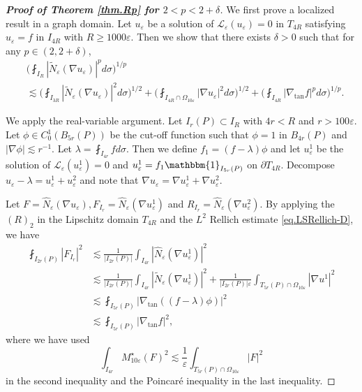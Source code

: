 \documentclass[reqno,12pt]{amsart} %
\theoremstyle{definition}
\theoremstyle{remark}
\numberwithin{equation}{section}
\newcommand{\cL}{\mathcal{L}}
\newcommand{\e}{\varepsilon}
\begin{document}
\begin{proof}[\textbf{Proof of Theorem \ref{thm.Rp} for $2<p<2+\delta$}]
We first prove a localized result in a graph domain. Let $u_\e$ be a solution of $\cL_\e(u_\e) = 0$ in $T_{4R}$ satisfying $u_\e = f$ in $I_{4R}$ with $R \ge 1000\e$. Then we show that there exists $\delta > 0$ such that for any $p\in (2, 2+\delta)$,
\begin{equation}\label{est.RpInTR}
\begin{aligned}
     & \bigg( \fint_{I_R} | \widetilde{N}_\e (\nabla u_\e)|^{p} d\sigma \bigg)^{1/{p}} \\
     & \lesssim \bigg( \fint_{I_{3R}} |\widetilde{N}_\e(\nabla u_\e)|^{2} d\sigma \bigg)^{1/{2}} + \bigg( \fint_{I_{4R}\cap \Omega_{10\e}} |\nabla u_\e|^{2} d\sigma \bigg)^{1/{2}} + \bigg( \fint_{I_{4R}} |\nabla_{\tan} f|^{p} d\sigma \bigg)^{1/p}. 
\end{aligned}
\end{equation}

We apply the real-variable argument. Let $ I_r(P) \subset I_R$ with $4r < R$ and $r>100\e$. Let $\phi \in C_0^1(B_{5r}(P))$ be the cut-off function such that $\phi = 1$ in $B_{4r}(P)$ and $|\nabla \phi| \lesssim r^{-1}$. Let $\lambda = \fint_{I_{4r}} f d\sigma$. Then we define $f_1 = (f-\lambda)\phi$ and let $u_\e^1$ be the solution of $\cL_\e(u_\e^1) = 0$ and $u_\e^1 = f_1 \mathbbm{1}_{I_{5r}(P)}$ on $\partial T_{4R}$. Decompose $u_\e - \lambda = u_\e^1 + u_\e^2$ and note that $\nabla u_\e = \nabla u_\e^1 + \nabla u_\e^2$.

Let $F = \widehat{N}_\e(\nabla u_\e), F_{I_r} = \widehat{N}_\e(\nabla u^1_\e)$ and $R_{I_r} =\widehat{N}_\e(\nabla u_\e^2)$. By applying the $(R)_2$ in the Lipschitz domain $T_{4R}$ and the $L^2$ Rellich estimate \eqref{eq.LSRellich-D}, we have
\begin{equation}
\begin{aligned}
    \fint_{I_{2r}(P)} |F_{I_{r}}|^2 & \lesssim \frac{1}{|I_{2r}(P)|} \int_{I_{4r}} |\widehat{N}_\e(\nabla u^1_\e)|^2 \\
    & \lesssim \frac{1}{|I_{2r}(P)|} \int_{ I_{4r}} |\widetilde{N}_\e(\nabla u^1_\e)|^2 + \frac{1}{|I_{2r}(P)|\e} \int_{T_{5r}(P) \cap \Omega_{10\e}} |\nabla u^1|^2 \\
    &\lesssim \fint_{I_{5r}(P)} |\nabla_{\tan}((f-\lambda)\phi)|^2 \\
    & \lesssim \fint_{I_{5r}(P)} |\nabla_{\tan} f|^2,
\end{aligned}
\end{equation}
where we have used 
\begin{equation}\label{est.Mstar-Layer}
    \int_{I_{4r}} M_{10\e}^\star(F)^2 \lesssim \frac{1}{\e} \int_{T_{5r}(P) \cap \Omega_{10\e}} |F|^2
\end{equation}
in the second inequality and
the Poincar\'{e} inequality in the last inequality.


\end{proof}
\end{document}

